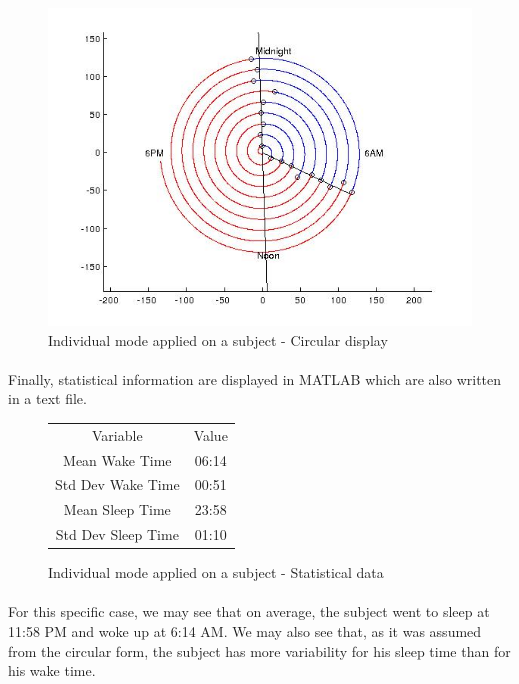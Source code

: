 \documentclass[a4paper,12pt]{article}
\newlength\savewidth
\newcommand\Ghline{%
	\noalign{\global\savewidth\arrayrulewidth\global\arrayrulewidth2pt}%
	\hline
	\noalign{\global\arrayrulewidth\savewidth}}
\begin{document}
\begin{figure}[H]
\centering
\includegraphics[scale=0.5]{Images/indivResultsCircle.jpg}
\caption{Individual mode applied on a subject - Circular display}
\label{indivCircle}
\end{figure}

\paragraph{}
Finally, statistical information are displayed in MATLAB which are also written in a text file.


\begin{figure}[H]
\centering
\begin{tabular}{|c|c|}
\hline
Variable & Value \\
\Ghline
Mean Wake Time & 06:14 \\
Std Dev Wake Time & 00:51 \\
Mean Sleep Time & 23:58 \\
Std Dev Sleep Time & 01:10 \\
\hline
\end{tabular}
\caption{Individual mode applied on a subject - Statistical data}
\end{figure}


\paragraph{}
For this specific case, we may see that on average, the subject went to sleep at 11:58 PM and woke up at 6:14 AM. We may also see that, as it was assumed from the circular form, the subject has more variability for his sleep time than for his wake time.
\end{document}
